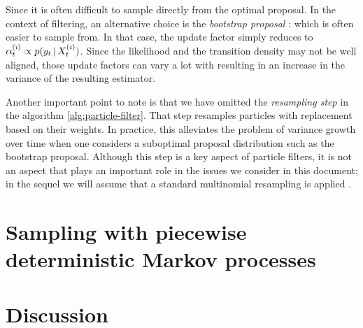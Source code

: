 Since it is often difficult to sample directly from the optimal proposal. In the context of filtering, an alternative choice is the \emph{bootstrap proposal} \citep{doucet11}: 
which is often easier to sample from. In that case, the update factor simply reduces to $\alpha^{(i)}_t \propto p(y_t\,|\, X^{(i)}_t)$. Since the likelihood and the transition density may not be well aligned, those update factors can vary a lot with resulting in an increase in the variance of the resulting estimator.

Another important point to note is that we have omitted the \emph{resampling step} in the algorithm \ref{alg:particle-filter}. That step resamples particles with replacement based on their weights. In practice, this alleviates the problem of variance growth over time when one considers a suboptimal proposal distribution such as the bootstrap proposal. Although this step is a key aspect of particle filters, it is not an aspect that plays an important role in the issues we consider in this document; in the sequel we will assume that a standard multinomial resampling is applied \citep{doucet11}.


\section{Sampling with piecewise deterministic Markov processes}


\section{Discussion}




